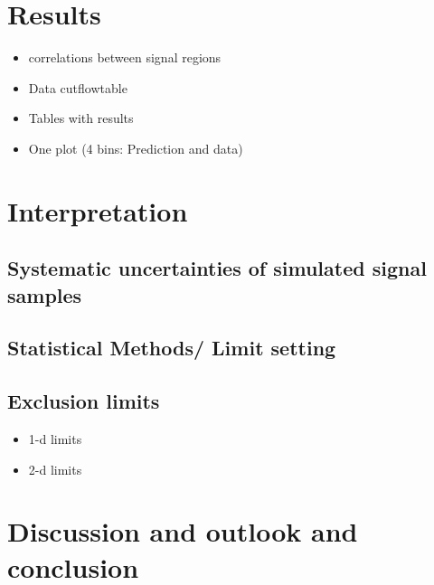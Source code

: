 \chapter{Results}
\label{sec:Results}

\begin{itemize}
\item correlations between signal regions
\item Data cutflowtable
\item Tables with results
\item One plot (4 bins: Prediction and data)
\end{itemize}


\chapter{Interpretation}
\label{sec:Interpretation}
\section{Systematic uncertainties of simulated signal samples}
\section{Statistical Methods/ Limit setting}
\section{Exclusion limits}
\begin{itemize}
\item 1-d limits
\item 2-d limits
\end{itemize}


\chapter{Discussion and outlook and conclusion}
\label{sec:Discussion}
